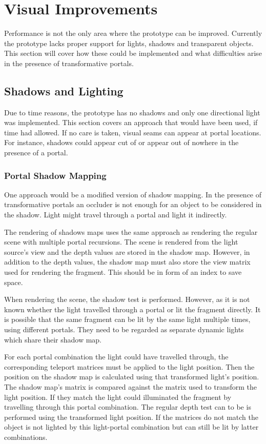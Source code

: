 \chapter{Visual Improvements}
Performance is not the only area where the prototype can be improved. Currently the prototype lacks proper support for lights, shadows and transparent objects. This section will cover how these could be implemented and what difficulties arise in the presence of transformative portals.

\section{Shadows and Lighting}
Due to time reasons, the prototype has no shadows and only one directional light was implemented. This section covers an approach that would have been used, if time had allowed. If no care is taken, visual seams can appear at portal locations. For instance, shadows could appear cut of or appear out of nowhere in the presence of a portal.

\subsection{Portal Shadow Mapping}
One approach would be a modified version of shadow mapping. In the presence of transformative portals an occluder is not enough for an object to be considered in the shadow. Light might travel through a portal and light it indirectly.

The rendering of shadows maps uses the same approach as rendering the regular scene with multiple portal recursions. The scene is rendered from the light source's view and the depth values are stored in the shadow map. However, in addition to the depth values, the shadow map must also store the view matrix used for rendering the fragment. This should be in form of an index to save space.

When rendering the scene, the shadow test is performed. However, as it is not known whether the light travelled through a portal or lit the fragment directly. It is possible that the same fragment can be lit by the same light multiple times, using different portals. They need to be regarded as separate dynamic lights which share their shadow map. 

For each portal combination the light could have travelled through, the corresponding teleport matrices must be applied to the light position. Then the position on the shadow map is calculated using that transformed light's position. The shadow map's matrix is compared against the matrix used to transform the light position. If they match the light could illuminated the fragment by travelling through this portal combination. The regular depth test can to be is performed using the transformed light position. If the matrices do not match the object is not lighted by this light-portal combination but can still be lit by latter combinations.


